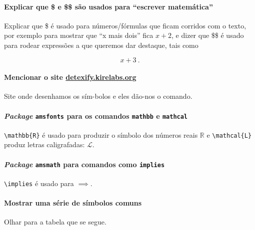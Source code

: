 \documentclass[11pt]{article}
\begin{document}
\paragraph{Explicar que \$ e \$\$ são usados para ``escrever matemática''}
Explicar que \$ é usado para números/fórmulas que ficam corridos com o texto,
por exemplo para mostrar que ``x mais dois'' fica $x+2$, e dizer que \$\$
é usado para rodear expressões a que queremos dar destaque, tais como

$$x + 3 ~.$$

\paragraph{Mencionar o site
\href{https://detexify.kirelabs.org}{detexify.kirelabs.org}}

Site onde desenhamos os sím-bolos e eles dão-nos o comando.

\paragraph{\textit{Package} \texttt{amsfonts} para os comandos
\texttt{mathbb} e \texttt{mathcal}}
\verb|\mathbb{R}| é usado para produzir o símbolo dos números reais $\mathbb{R}$
e \verb|\mathcal{L}| produz letras caligrafadas: $\mathcal{L}$.

\paragraph{\textit{Package} \texttt{amsmath} para comandos como \texttt{implies}}
\verb|\implies| é usado para $\implies$.

\paragraph{Mostrar uma série de símbolos comuns}
Olhar para a tabela que se segue.
\end{document}
